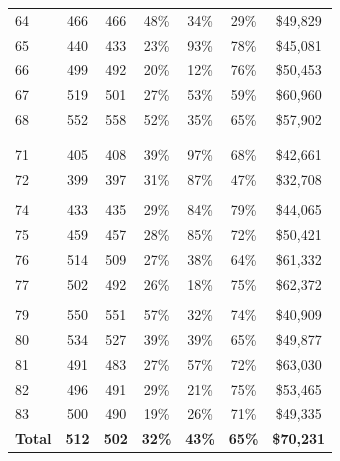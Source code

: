 \documentclass[
  12pt,
]{article}
\begin{document}
\begin{table}
{\begin{tabular}[t]{>{}l>{}c>{}c>{}c>{}c>{}c>{}c}
64 & 466 & 466 & 48\% & 34\% & 29\% & \$49,829\\
65 & 440 & 433 & 23\% & 93\% & 78\% & \$45,081\\
66 & 499 & 492 & 20\% & 12\% & 76\% & \$50,453\\
67 & 519 & 501 & 27\% & 53\% & 59\% & \$60,960\\
68 & 552 & 558 & 52\% & 35\% & 65\% & \$57,902\\
\cellcolor[HTML]{b9efe6}{69} & \cellcolor[HTML]{b9efe6}{534} & \cellcolor[HTML]{b9efe6}{521} & \cellcolor[HTML]{b9efe6}{37\%} & \cellcolor[HTML]{b9efe6}{19\%} & \cellcolor[HTML]{b9efe6}{65\%} & \cellcolor[HTML]{b9efe6}{\$88,100}\\
\cellcolor[HTML]{b9efe6}{70} & \cellcolor[HTML]{b9efe6}{613} & \cellcolor[HTML]{b9efe6}{598} & \cellcolor[HTML]{b9efe6}{65\%} & \cellcolor[HTML]{b9efe6}{29\%} & \cellcolor[HTML]{b9efe6}{61\%} & \cellcolor[HTML]{b9efe6}{\$86,381}\\
71 & 405 & 408 & 39\% & 97\% & 68\% & \$42,661\\
72 & 399 & 397 & 31\% & 87\% & 47\% & \$32,708\\
\cellcolor[HTML]{b9efe6}{73} & \cellcolor[HTML]{b9efe6}{528} & \cellcolor[HTML]{b9efe6}{514} & \cellcolor[HTML]{b9efe6}{29\%} & \cellcolor[HTML]{b9efe6}{42\%} & \cellcolor[HTML]{b9efe6}{62\%} & \cellcolor[HTML]{b9efe6}{\$90,849}\\
74 & 433 & 435 & 29\% & 84\% & 79\% & \$44,065\\
75 & 459 & 457 & 28\% & 85\% & 72\% & \$50,421\\
76 & 514 & 509 & 27\% & 38\% & 64\% & \$61,332\\
77 & 502 & 492 & 26\% & 18\% & 75\% & \$62,372\\
\cellcolor[HTML]{b9efe6}{78} & \cellcolor[HTML]{b9efe6}{594} & \cellcolor[HTML]{b9efe6}{578} & \cellcolor[HTML]{b9efe6}{56\%} & \cellcolor[HTML]{b9efe6}{26\%} & \cellcolor[HTML]{b9efe6}{39\%} & \cellcolor[HTML]{b9efe6}{\$134,400}\\
79 & 550 & 551 & 57\% & 32\% & 74\% & \$40,909\\
80 & 534 & 527 & 39\% & 39\% & 65\% & \$49,877\\
81 & 491 & 483 & 27\% & 57\% & 72\% & \$63,030\\
82 & 496 & 491 & 29\% & 21\% & 75\% & \$53,465\\
83 & 500 & 490 & 19\% & 26\% & 71\% & \$49,335\\
\addlinespace
\textbf{Total} & \textbf{512} & \textbf{502} & \textbf{32\%} & \textbf{43\%} & \textbf{65\%} & \textbf{\$70,231}\\
\bottomrule
\end{tabular}}
\end{table}
\begingroup
\fontsize{10}{10}\selectfont
\end{document}
